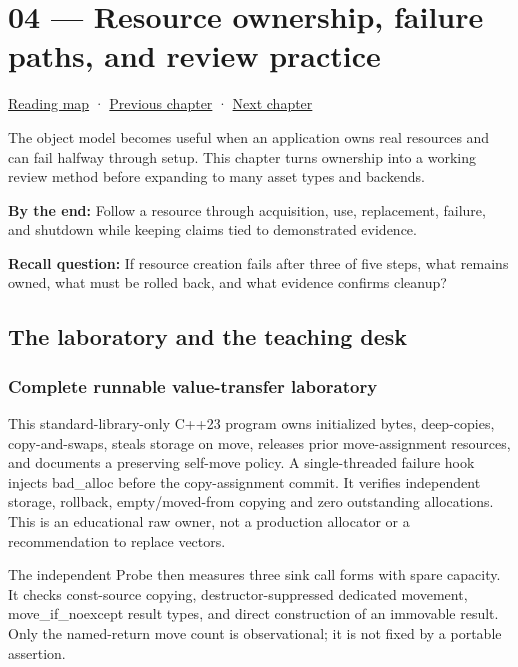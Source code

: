 \hypertarget{05-engine-i-ch004}{}
\section{04 --- Resource ownership, failure paths, and review practice}\label{resource-ownership-failure-paths-and-review-practice}

\href{Chapter\%20Edition/03\%20-\%20Game\%20Engine/00\%20-\%20Reading\%20Map}{Reading map} · \hyperref[05-engine-i-ch003]{Previous chapter} · \hyperref[05-engine-i-ch005]{Next chapter}

The object model becomes useful when an application owns real resources and can fail halfway through setup. This chapter turns ownership into a working review method before expanding to many asset types and backends.

\textbf{By the end:} Follow a resource through acquisition, use, replacement, failure, and shutdown while keeping claims tied to demonstrated evidence.

\textbf{Recall question:} If resource creation fails after three of five steps, what remains owned, what must be rolled back, and what evidence confirms cleanup?

\subsection{The laboratory and the teaching desk}\label{the-laboratory-and-the-teaching-desk}

\subsubsection{Complete runnable value-transfer laboratory}\label{complete-runnable-value-transfer-laboratory}

This standard-library-only C++23 program owns initialized bytes, deep-copies, copy-and-swaps, steals storage on move, releases prior move-assignment resources, and documents a preserving self-move policy. A single-threaded failure hook injects bad\_alloc before the copy-assignment commit. It verifies independent storage, rollback, empty/moved-from copying and zero outstanding allocations. This is an educational raw owner, not a production allocator or a recommendation to replace vectors.

The independent Probe then measures three sink call forms with spare capacity. It checks const-source copying, destructor-suppressed dedicated movement, move\_if\_noexcept result types, and direct construction of an immovable result. Only the named-return move count is observational; it is not fixed by a portable assertion.

